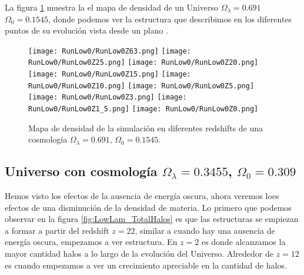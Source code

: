 La figura \ref{fig:Low0-DensityMap} muestra la el mapa de densidad de un Universo $\Omega_\lambda = 0.691$ $\Omega_0 = 0.1545$, donde podemos ver la estructura que describimos  en los diferentes puntos de su evolución vista desde un plano .
\begin{figure}[H]
    \centering

    \texttt{[image: RunLow0/RunLow0Z63.png]}   %
    \texttt{[image: RunLow0/RunLow0Z25.png]}   %
    \texttt{[image: RunLow0/RunLow0Z20.png]}   %
    \\
    \texttt{[image: RunLow0/RunLow0Z15.png]}   %
    \texttt{[image: RunLow0/RunLow0Z10.png]}   %
    \texttt{[image: RunLow0/RunLow0Z5.png]}    %
    \\
    \texttt{[image: RunLow0/RunLow0Z3.png]}    %
    \texttt{[image: RunLow0/RunLow0Z1\_5.png]}  %
    \texttt{[image: RunLow0/RunLow0Z0.png]}    %
    \caption[Mapa de densidad de un Universo $\Omega_\lambda = 0.691$, $\Omega_0 = 0.1545$ en en diferentes redshift]{ \footnotesize Mapa de densidad de la simulación en diferentes redshifts de una cosmología $\Omega_\lambda = 0.691$, $\Omega_0 = 0.1545$. }
    \label{fig:Low0-DensityMap}
\end{figure}


\subsection{Universo con cosmología \texorpdfstring{$\Omega_\lambda = 0.3455$, $\Omega_0 = 0.309$ }{Omega lambda = 0.3455, Omega 0 = 0.309}  }

Hemos visto los efectos de la ausencia de energía oscura, ahora veremos loes efectos de una disminución de la densidad de materia. Lo primero que podemos observar en la figura \ref{fig:LowLam_TotalHalos} es que las estructuras se empiezan a formar a partir del redshift $z=22$, similar a cuando hay una ausencia de energía oscura, empezamos a ver estructura. En $z= 2$ es donde alcanzamos la mayor cantidad halos a lo largo de la evolución del Universo. Alrededor de $z = 12$ es cuando empezamos a ver un crecimiento apreciable en la cantidad de halos.

